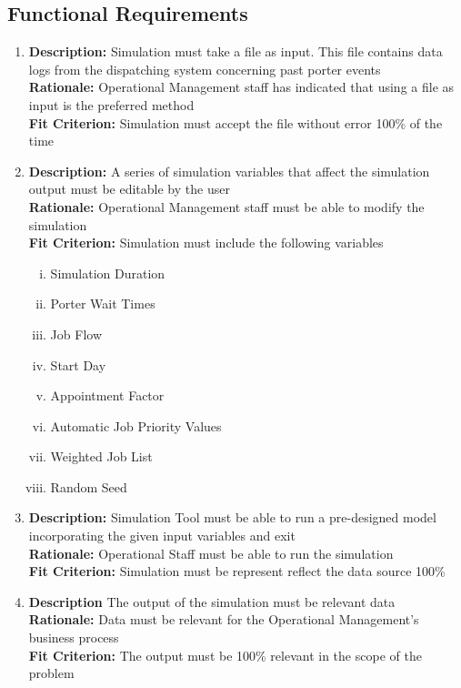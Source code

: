 \documentclass[paper=letter, fontsize=10pt]{scrartcl}
\numberwithin{equation}{section}		%
\numberwithin{figure}{section}			%
\numberwithin{table}{section}				%
\begin{document}
\subsection{Functional Requirements}
\begin{enumerate}
	\item \textbf{Description:} Simulation must take a file as input. This file contains data logs from the dispatching system concerning past porter events
	\\ \textbf{Rationale:} Operational Management staff has indicated that using a file as input is the preferred method 
	\\ \textbf{Fit Criterion:} Simulation must accept the file without error 100\% of the time
	\item \textbf{Description:} A series of simulation variables that affect the simulation output must be editable by the user
	\\ \textbf{Rationale:} Operational Management staff must be able to modify the simulation
	\\ \textbf{Fit Criterion:} Simulation must include the following variables   
	\begin{enumerate}[(i)]
		\item Simulation Duration
		\item Porter Wait Times
		\item Job Flow
		\item Start Day
		\item Appointment Factor
		\item Automatic Job Priority Values
		\item Weighted Job List
		\item Random Seed
	\end{enumerate}
	\item \textbf{Description:} Simulation Tool must be able to run a pre-designed model incorporating the given input variables and exit
	\\ \textbf{Rationale:} Operational Staff must be able to run the simulation
	\\ \textbf{Fit Criterion:} Simulation must be represent reflect the data source 100\%
	\item \textbf{Description} The output of the simulation must be relevant data
	\\ \textbf{Rationale:} Data must be relevant for the Operational Management's business process
	\\ \textbf{Fit Criterion:} The output must be 100\% relevant in the scope of the problem

\end{enumerate}
\end{document}
